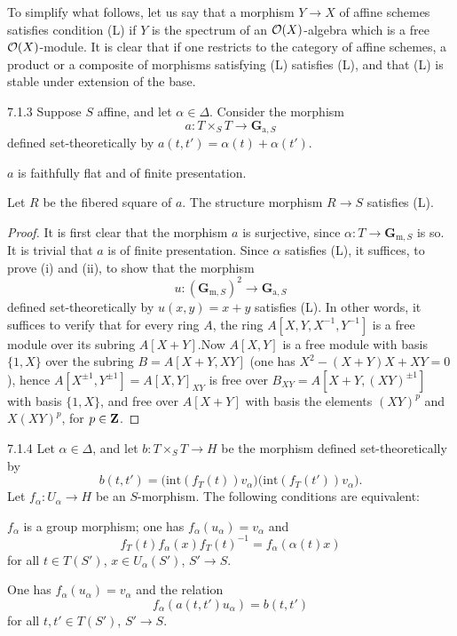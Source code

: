 To simplify what follows, let us say that a morphism $Y\to X$ of affine schemes satisfies condition (L) if $Y$ is the spectrum of an $\mathcal{O}(X)$-algebra which is a free $\mathcal{O}(X)$-module. It is clear that if one restricts to the category of affine schemes, a product or a composite of morphisms satisfying (L) satisfies (L), and that (L) is stable under extension of the base.
\begin{lemma}{7.1.3}\label{XXIV.7.1.3}
Suppose $S$ affine, and let $\alpha\in\Delta$. Consider the morphism
\[
a:T\times_S T\to\mathbf G_{\mathrm a,S}
\]
defined set-theoretically by $a(t,t')=\alpha(t)+\alpha(t')$.
\begin{enumeratei}
\item $a$ is faithfully flat and of finite presentation.
\item Let $R$ be the fibered square of $a$. The structure morphism $R\to S$ satisfies (L).
\end{enumeratei}
\end{lemma}
\begin{proof}
It is first clear that the morphism $a$ is surjective, since $\alpha:T\to\mathbf G_{\mathrm m,S}$ is so. It is trivial that $a$ is of finite presentation. Since $\alpha$ satisfies (L), it suffices, to prove (i) and (ii), to show that the morphism
\[
u:(\mathbf G_{\mathrm m,S})^2\to\mathbf G_{\mathrm a,S}
\]
defined set-theoretically by $u(x,y)=x+y$ satisfies (L). In other words, it suffices to verify that for every ring $A$, the ring $A[X,Y,X^{-1},Y^{-1}]$ is a free module over its subring $A[X+Y]$.Now $A[X,Y]$ is a free module with basis $\{1,X\}$ over the subring $B=A[X+Y,XY]$ (one has $X^2-(X+Y)X+XY=0$), hence $A[X^{\pm1},Y^{\pm1}]=A[X,Y]_{XY}$ is free over $B_{XY}=A[X+Y,(XY)^{\pm1}]$ with basis $\{1,X\}$, and free over $A[X+Y]$ with basis the elements $(XY)^p$ and $X(XY)^p$, for $p\in\mathbf{Z}$.
\end{proof}
\begin{lemma}{7.1.4}\label{XXIV.7.1.4}
Let $\alpha\in\Delta$, and let $b:T\times_S T\to H$ be the morphism defined set-theoretically by
\[
b(t,t')=\bigl(\mathrm{int}(f_T(t))v_\alpha\bigr)\bigl(\mathrm{int}(f_T(t'))v_\alpha\bigr).
\]
Let $f_\alpha:U_\alpha\to H$ be an $S$-morphism. The following conditions are equivalent:
\begin{enumeratei}
\item $f_\alpha$ is a group morphism; one has $f_\alpha(u_\alpha)=v_\alpha$ and
\[
f_T(t)f_\alpha(x)f_T(t)^{-1}=f_\alpha(\alpha(t)x)
\]
for all $t\in T(S')$, $x\in U_\alpha(S')$, $S'\to S$.
\item One has $f_\alpha(u_\alpha)=v_\alpha$ and the relation
\[
f_\alpha(a(t,t')u_\alpha)=b(t,t')
\]
for all $t,t'\in T(S')$, $S'\to S$.
\end{enumeratei}
\end{lemma}
